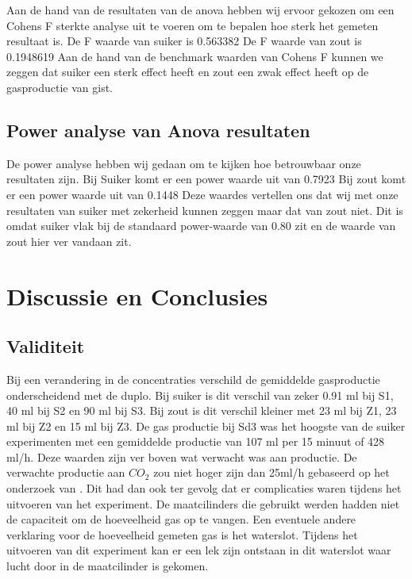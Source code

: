 \documentclass[
]{article}
\begin{document}
Aan de hand van de resultaten van de anova hebben wij ervoor gekozen om een Cohens F sterkte analyse uit te voeren om te bepalen hoe sterk het gemeten resultaat is.
De F waarde van suiker is 0.563382
De F waarde van zout is 0.1948619
Aan de hand van de benchmark waarden van Cohens F kunnen we zeggen dat suiker een sterk effect heeft en zout een zwak effect heeft op de gasproductie van gist.

\subsection{Power analyse van Anova resultaten}\label{power-analyse-van-anova-resultaten}

De power analyse hebben wij gedaan om te kijken hoe betrouwbaar onze resultaten zijn.
Bij Suiker komt er een power waarde uit van 0.7923
Bij zout komt er een power waarde uit van 0.1448
Deze waardes vertellen ons dat wij met onze resultaten van suiker met zekerheid kunnen zeggen maar dat van zout niet. Dit is omdat suiker vlak bij de standaard power-waarde van 0.80 zit en de waarde van zout hier ver vandaan zit.

\section{Discussie en Conclusies}\label{discussie-en-conclusies}

\subsection{Validiteit}\label{validiteit}

Bij een verandering in de concentraties verschild de gemiddelde gasproductie onderscheidend met de duplo. Bij suiker is dit verschil van zeker 0.91 ml bij S1, 40 ml bij S2 en 90 ml bij S3. Bij zout is dit verschil kleiner met 23 ml bij Z1, 23 ml bij Z2 en 15 ml bij Z3. De gas productie bij Sd3 was het hoogste van de suiker experimenten met een gemiddelde productie van 107 ml per 15 minuut of 428 ml/h.
Deze waarden zijn ver boven wat verwacht was aan productie. De verwachte productie aan \(CO_2\) zou niet hoger zijn dan 25ml/h gebaseerd op het onderzoek van \cite{Jerry2017}. Dit had dan ook ter gevolg dat er complicaties waren tijdens het uitvoeren van het experiment. De maatcilinders die gebruikt werden hadden niet de capaciteit om de hoeveelheid gas op te vangen.
Een eventuele andere verklaring voor de hoeveelheid gemeten gas is het waterslot. Tijdens het uitvoeren van dit experiment kan er een lek zijn ontstaan in dit waterslot waar lucht door in de maatcilinder is gekomen.
\end{document}

